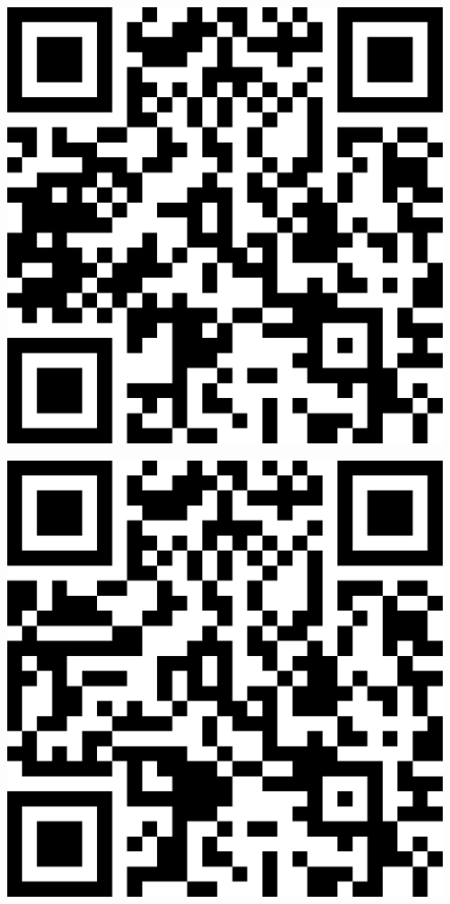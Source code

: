 \documentclass[letterpaper]{article}
\begin{document}
 \endgroup 
 \vspace*{\fill} 
 \pagebreak 
{} 
 \vspace*{\fill} 
 \begingroup 
 \centerline{\includegraphics[scale=1,width=5in,height=5in]{Office3569.png}} 
 \endgroup 
 \vspace*{\fill} 
 \pagebreak 
{} 
 \vspace*{\fill} 
 \begingroup 
 \centerline{\includegraphics[scale=1,width=5in,height=5in]{Office3571.png}} 
\end{document}
